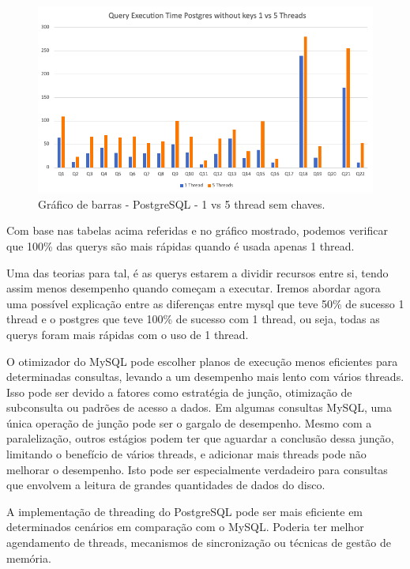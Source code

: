 \documentclass{article}
\begin{document}
  \begin{figure}[H]
    \centering
    \includegraphics[width=\textwidth]{Graphs/postgres_withoutkeys_1vs5.png}
    \caption{Gráfico de barras - PostgreSQL - 1 vs 5 thread sem chaves.} 
    \label{fig:PKCreation2}
  \end{figure}

  Com base nas tabelas acima referidas e no gráfico mostrado, podemos verificar que 100\% das querys são mais rápidas quando é usada apenas 1 thread.
  
  Uma das teorias para tal, é as querys estarem a dividir recursos entre si, tendo assim menos desempenho quando começam a executar. Iremos abordar agora uma possível explicação entre as diferenças entre mysql que teve 50\% de sucesso 1 thread e o postgres que teve 100\% de sucesso com 1 thread, ou seja, todas as querys foram mais rápidas com o uso de 1 thread.

  O otimizador do MySQL pode escolher planos de execução menos eficientes para determinadas consultas, levando a um desempenho mais lento com vários threads. Isso pode ser devido a fatores como estratégia de junção, otimização de subconsulta ou padrões de acesso a dados. Em algumas consultas MySQL, uma única operação de junção pode ser o gargalo de desempenho. Mesmo com a paralelização, outros estágios podem ter que aguardar a conclusão dessa junção, limitando o benefício de vários threads, e adicionar mais threads pode não melhorar o desempenho. Isto pode ser especialmente verdadeiro para consultas que envolvem a leitura de grandes quantidades de dados do disco.

  A implementação de threading do PostgreSQL pode ser mais eficiente em determinados cenários em comparação com o MySQL. Poderia ter melhor agendamento de threads, mecanismos de sincronização ou técnicas de gestão de memória.
\end{document}
